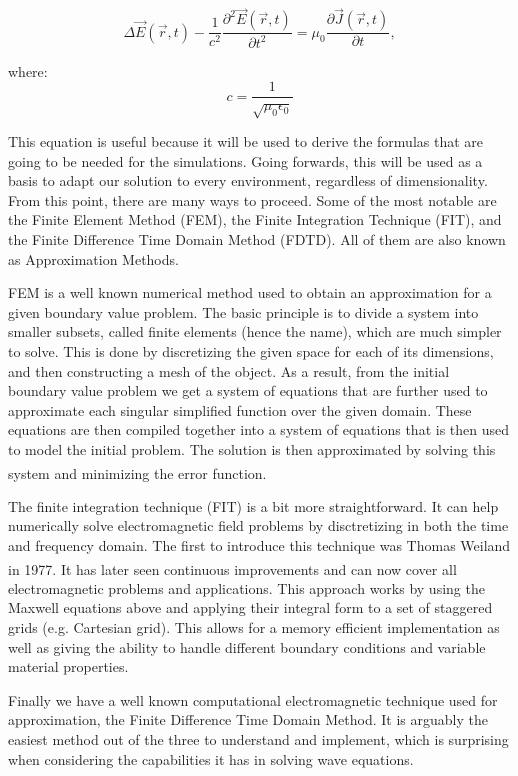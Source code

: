 \begin{equation}
	\label{eqn:waveEquation}
	\Delta\vec{E}(\vec{r},t) - \frac{1}{c^2} \frac{\partial^2 \vec{E}(\vec{r},t)}{\partial t^2} = \mu_{0} \frac{\partial \vec{J}(\vec{r},t)}{\partial t},
\end{equation}

where: $$c = \frac{1}{\sqrt{\mu_{0}\epsilon_{0}}}$$

This equation is useful because it will be used to derive the formulas that are going to be needed for the simulations. Going forwards, this will be used as a basis to adapt our solution to every environment, regardless of dimensionality. From this point, there are many ways to proceed. Some of the most notable are the Finite Element Method (FEM), the Finite Integration Technique (FIT), and the Finite Difference Time Domain Method (FDTD). All of them are also known as Approximation Methods.

FEM is a well known numerical method used to obtain an approximation for a given boundary value problem. The basic principle is to divide a system into smaller subsets, called finite elements (hence the name), which are much simpler to solve. This is done by discretizing the given space for each of its dimensions, and then constructing a mesh of the object. As a result, from the initial boundary value problem we get a system of equations that are further used to approximate each singular simplified function over the given domain. These equations are then compiled together into a system of equations that is then used to model the initial problem. The solution is then approximated by solving this system and minimizing the error function.\textsuperscript{\cite{logan2011first}}

The finite integration technique (FIT) is a bit more straightforward. It can help numerically solve electromagnetic field problems by disctretizing in both the time and frequency domain. The first to introduce this technique was Thomas Weiland in 1977.\textsuperscript{\cite{weiland1977discretization}} It has later seen continuous improvements and can now cover all electromagnetic problems and applications. This approach works by using the Maxwell equations above and applying their integral form to a set of staggered grids (e.g. Cartesian grid). This allows for a memory efficient implementation as well as giving the ability to handle different boundary conditions and variable material properties.

Finally we have a well known computational electromagnetic technique used for approximation, the Finite Difference Time Domain Method. It is arguably the easiest method out of the three to understand and implement, which is surprising when considering the capabilities it has in solving wave equations. 

